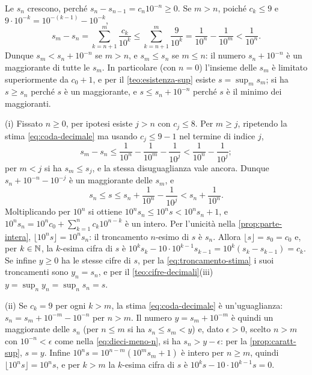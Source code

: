 \begin{dimostrazione}
Le $s_{n}$ crescono, perché $s_{n}-s_{n-1}=c_{n}10^{-n}\ge0$. Se $m>n$, poiché
$c_{k}\le9$ e $9\cdot10^{-k}=10^{-(k-1)}-10^{-k}$,
\begin{equation}\label{eq:coda-decimale}
  s_{m}-s_{n}=\sum_{k=n+1}^{m}\frac{c_{k}}{10^{k}}\le\sum_{k=n+1}^{m}\frac{9}{10^{k}}
  =\frac{1}{10^{n}}-\frac{1}{10^{m}}<\frac{1}{10^{n}} .
\end{equation}
Dunque $s_{m}<s_{n}+10^{-n}$ se $m>n$, e $s_{m}\le s_{n}$ se $m\le n$: il numero
$s_{n}+10^{-n}$ è un maggiorante di tutte le $s_{m}$. In particolare (con $n=0$)
l'insieme delle $s_{m}$ è limitato superiormente da $c_{0}+1$, e per il
\cref{teo:esistenza-sup} esiste $s=\sup_{m}s_{m}$; si ha $s\ge s_{n}$ perché $s$ è un
maggiorante, e $s\le s_{n}+10^{-n}$ perché $s$ è il minimo dei maggioranti.

(i) Fissato $n\ge0$, per ipotesi esiste $j>n$ con $c_{j}\le8$. Per $m\ge j$, ripetendo la
stima \eqref{eq:coda-decimale} ma usando $c_{j}\le9-1$ nel termine di indice $j$,
\[
  s_{m}-s_{n}\le\frac{1}{10^{n}}-\frac{1}{10^{m}}-\frac{1}{10^{j}}
  <\frac{1}{10^{n}}-\frac{1}{10^{j}} ;
\]
per $m<j$ si ha $s_{m}\le s_{j}$, e la stessa disuguaglianza vale ancora. Dunque
$s_{n}+10^{-n}-10^{-j}$ è un maggiorante delle $s_{m}$, e
\[
  s_{n}\le s\le s_{n}+\frac{1}{10^{n}}-\frac{1}{10^{j}}<s_{n}+\frac{1}{10^{n}} .
\]
Moltiplicando per $10^{n}$ si ottiene $10^{n}s_{n}\le10^{n}s<10^{n}s_{n}+1$, e
$10^{n}s_{n}=10^{n}c_{0}+\sum_{k=1}^{n}c_{k}10^{n-k}$ è un intero. Per l'unicità nella
\cref{prop:parte-intera}, $\lfloor10^{n}s\rfloor=10^{n}s_{n}$: il troncamento $n$-esimo
di $s$ è $s_{n}$. Allora $\lfloor s\rfloor=s_{0}=c_{0}$ e, per $k\in\mathbb{N}$, la $k$-esima
cifra di $s$ è $10^{k}s_{k}-10\cdot10^{k-1}s_{k-1}=10^{k}(s_{k}-s_{k-1})=c_{k}$. Se infine
$y\ge0$ ha le stesse cifre di $s$, per la \eqref{eq:troncamento-stima} i suoi troncamenti
sono $y_{n}=s_{n}$, e per il \cref{teo:cifre-decimali}(iii)
$y=\sup_{n}y_{n}=\sup_{n}s_{n}=s$.

(ii) Se $c_{k}=9$ per ogni $k>m$, la stima \eqref{eq:coda-decimale} è un'uguaglianza:
$s_{n}=s_{m}+10^{-m}-10^{-n}$ per $n>m$. Il numero $y=s_{m}+10^{-m}$ è quindi un
maggiorante delle $s_{n}$ (per $n\le m$ si ha $s_{n}\le s_{m}<y$) e, dato $\epsilon>0$,
scelto $n>m$ con $10^{-n}<\epsilon$ come nella \eqref{eq:dieci-meno-n}, si ha
$s_{n}>y-\epsilon$:
per la \cref{prop:caratt-sup}, $s=y$. Infine $10^{n}s=10^{n-m}(10^{m}s_{m}+1)$ è intero
per $n\ge m$, quindi $\lfloor10^{n}s\rfloor=10^{n}s$, e per $k>m$ la $k$-esima cifra di
$s$ è $10^{k}s-10\cdot10^{k-1}s=0$.
\end{dimostrazione}

